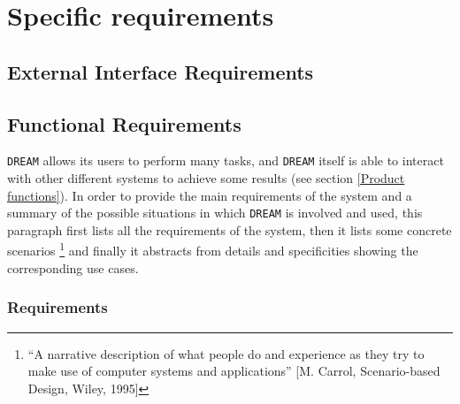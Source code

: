\documentclass{article}
\begin{document}
\section{Specific requirements}
\subsection{External Interface Requirements}
\subsection{Functional Requirements}
\verb |DREAM| allows its users to perform many tasks, and \verb |DREAM| itself is able to interact with other different systems to achieve some results (see section \ref{Product functions}). In order to provide the main requirements of the system and a summary of the possible situations in which \verb |DREAM| is involved and used, this paragraph first lists all the requirements of the system, then it lists some concrete scenarios \footnote{“A narrative description of what people do and experience as
they try to make use of computer systems and applications” [M.
Carrol, Scenario-based Design, Wiley, 1995]} and finally it abstracts from details and specificities showing the corresponding use cases.
\subsubsection{Requirements}
\end{document}
